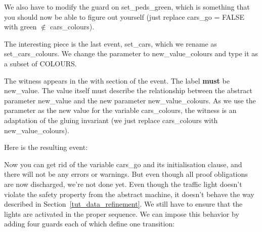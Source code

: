 We also have to modify the guard on \textsf{set\_peds\_green}, which is something that you should now be able to figure out yourself (just replace \textsf{cars\_go = FALSE} with \textsf{green} $\notin$ \textsf{cars\_colours}).

The interesting piece is the last event, \textsf{set\_cars}, which we rename as \textsf{set\_cars\-\_colours}.  We change the parameter to \textsf{new\_value\_colours} and type it as a subset of \textsf{COLOURS}.

The witness appears in the \textsf{with} section of the event.  The label \textbf{must} be \textsf{new\_value}.  The value itself must describe the relationship between the abstract parameter \textsf{new\_value} and the new parameter \textsf{new\_value\_colours}.  As we use the parameter as the new value for the variable \textsf{cars\_colours}, the witness is an adaptation of the gluing invariant (we just replace \textsf{cars\_colours} with \textsf{new\_value\_colours}).


Here is the resulting event:


Now you can get rid of the variable \textsf{cars\_go} and its initialisation clause, and there will not be any errors or warnings. But even though all proof obligations are now discharged, we're not done yet. Even though the traffic light doesn't violate the safety property from the abstract machine, it doesn't behave the way described in Section~\ref{tut_data_refinement}.  We still have to ensure that the lights are activated in the proper sequence.  We can impose this behavior by adding four guards each of which define one transition:

